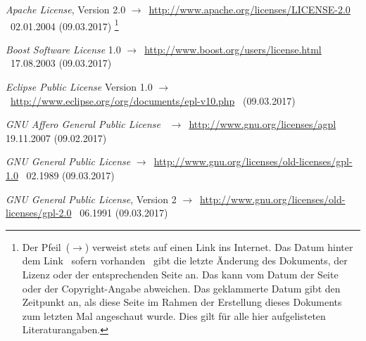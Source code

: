\documentclass[english,ngerman,parskip=half,headsepline,footsepline]{scrreprt}
\begin{document}

	\ihead{\textnormal{\textsf{\textbf{\listfigurename}}}}
	\begin{minipage}{\textwidth-10.95pt}
		\listoffigures
	\end{minipage}\par
	\thispagestyle{scrheadings}


	\begin{flushleft}
		\begin{thebibliography}{12}
			\ihead{\textnormal{\textsf{\textbf{\bibname}}}}
			\thispagestyle{scrheadings}

			\emph{Apache License}, Version 2.0 $\rightarrow$~\url{http://www.apache.org/licenses/LICENSE-2.0} \textendash\ 02.01.2004 (09.03.2017)
			\footnote{Der Pfeil~($\rightarrow$) verweist stets auf einen Link ins Internet. Das Datum hinter dem Link \textendash\ sofern vorhanden \textendash\ gibt die letzte Änderung des Dokuments, der Lizenz oder der entsprechenden Seite an. Das kann vom Datum der Seite oder der Copyright-Angabe abweichen. Das geklammerte Datum gibt den Zeitpunkt an, als diese Seite im Rahmen der Erstellung dieses Dokuments zum letzten Mal angeschaut wurde. Dies gilt für alle hier aufgelisteten Literaturangaben.}

			\emph{Boost Software License} 1.0 $\rightarrow$~\url{http://www.boost.org/users/license.html} \textendash\ 17.08.2003 (09.03.2017)

			\emph{Eclipse Public License} Version 1.0 $\rightarrow$~\url{http://www.eclipse.org/org/documents/epl-v10.php} \textendash\ (09.03.2017)

			\emph{GNU Affero General Public License} \textendash\ $\rightarrow$~\url{http://www.gnu.org/licenses/agpl} 19.11.2007 (09.02.2017)

			\emph{GNU General Public License} $\rightarrow$~\url{http://www.gnu.org/licenses/old-licenses/gpl-1.0} \textendash\ 02.1989 (09.03.2017)

			\emph{GNU General Public License}, Version 2 $\rightarrow$~\url{http://www.gnu.org/licenses/old-licenses/gpl-2.0} \textendash\ 06.1991 (09.03.2017)


\end{thebibliography}
\end{flushleft}
\end{document}
